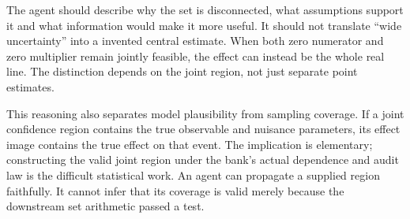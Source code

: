 The agent should describe why the set is disconnected, what assumptions support
it and what information would make it more useful. It should not translate
``wide uncertainty'' into a invented central estimate. When both zero numerator
and zero multiplier remain jointly feasible, the effect can instead be the
whole real line. The distinction depends on the joint region, not just
separate point estimates.

This reasoning also separates model plausibility from sampling coverage. If a
joint confidence region contains the true observable and nuisance parameters,
its effect image contains the true effect on that event. The implication is
elementary; constructing the valid joint region under the bank's actual
dependence and audit law is the difficult statistical work. An agent can
propagate a supplied region faithfully. It cannot infer that its coverage is
valid merely because the downstream set arithmetic passed a test.
